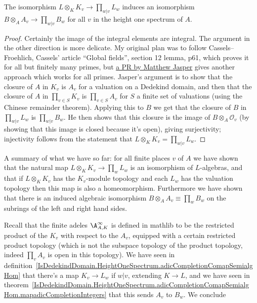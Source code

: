 \begin{theorem}
  \label{IsDedekindDomain.HeightOneSpectrum.adicCompletionComapAlgEquiv_integral}
  \leanok
  The isomorphism $L\otimes_KK_v\to\prod_{w|v}L_w$ induces an isomorphism
  $B\otimes_AA_v\to \prod_{w|v}B_w$
  for all $v$ in the height one spectrum of $A$.
\end{theorem}
\begin{proof}
  \leanok
  Certainly the image of the integral elements are integral. The argument in the other
  direction is more delicate. My original plan was to follow Cassels--Froehlich,
  Cassels' article ``Global fields'', section 12 lemma, p61, which proves it for
  all but finitely many primes, but \href{https://github.com/ImperialCollegeLondon/FLT/pull/400}
  {a PR by Matthew Jasper} gives another approach which works for all primes.
  Jasper's argument is to show that the closure of $A$ in $K_v$ is $A_v$
  for a valuation on a Dedekind domain, and then that the closure of $A$ in $\prod_{v\in S}K_v$
  is $\prod_{v\in S}A_v$ for $S$ a finite set of valuations (using the Chinese
  remainder theorem). Applying this to $B$ we get that the closure of $B$ in $\prod_{w|v}L_w$
  is $\prod_{w|v}B_w$. He then shows that this closure is the image of
  $B\otimes_A\mathcal{O}_v$ (by showing that this image is closed because it's open),
  giving surjectivity; injectivity follows from the statement
  that $L\otimes_KK_v=\prod_{w|v}L_w$.
\end{proof}

A summary of what we have so far: for all finite places $v$ of $A$
we have shown that the natural map $L\otimes_KK_v\to\prod_wL_w$
is an isomorphism of $L$-algebras, and that if $L\otimes_KK_v$ has
the $K_v$-module topology and each $L_w$ has the valuation topology
then this map is also a homeomorphism. Furthermore we have shown
that there is an induced algebraic isomorphism $B\otimes_AA_v\equiv\prod_w B_w$
on the subrings of the left and right hand sides.

Recall that the finite adeles $\A_{A,K}^\infty$ is defined in mathlib to be
the restricted product of the $K_v$ with respect to the $A_v$, equipped with a certain
restricted product topology (which is not the subspace topology of the product
topology, indeed $\prod_v A_v$ is open in this topology). We have seen in definition~\ref{IsDedekindDomain.HeightOneSpectrum.adicCompletionComapSemialgHom} that there's a map $K_v\to L_w$
if $w|v$, extending $K\to L$, and we have seen in theorem~\ref{IsDedekindDomain.HeightOneSpectrum.adicCompletionComapSemialgHom.mapadicCompletionIntegers} that this sends $A_v$ to $B_w$. We
conclude

